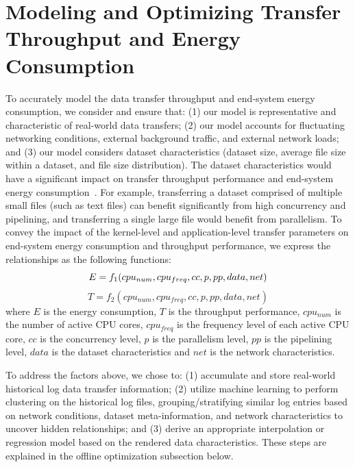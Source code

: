 \documentclass[conference]{IEEEtran}
\begin{document}
\section{Modeling and Optimizing Transfer Throughput and Energy Consumption}
To accurately model the data transfer throughput and end-system energy consumption, we consider and ensure that:
(1) our model is representative and characteristic of real-world data transfers; (2) our model accounts for fluctuating networking conditions, external background traffic, and external network loads; and (3) our model considers dataset characteristics (dataset size, average file size within a dataset, and file size distribution). The dataset characteristics would have a significant impact on transfer throughput performance and end-system energy consumption~\cite{alan2015energy}. For example, transferring a dataset comprised of multiple small files (such as text files) can benefit significantly from high concurrency and pipelining, and transferring a single large file would benefit from parallelism. To convey the impact of the kernel-level and application-level transfer parameters on end-system energy consumption and throughput performance, we express the relationships as the following functions:  
\begin{equation}
\label{Energy_Equation_2}
E = f_1(cpu_{num}, cpu_{freq}, cc, p, pp, data, net)\newline 
\end{equation}
\begin{equation}
\label{Throughput_Equation}
T = f_2(cpu_{num}, cpu_{freq}, cc, p, pp, data, net) 
\end{equation}
where $E$ is the energy consumption, $T$ is the throughput performance, $cpu_{num}$ is the number of active CPU cores, $cpu_{freq}$ is the frequency level of each active CPU core, $cc$ is the concurrency level, $p$ is the parallelism level, $pp$ is the pipelining level, $data$ is the dataset characteristics and $net$ is the network characteristics.

To address the factors above, we chose to: 
(1) accumulate and store real-world historical log data transfer information; %
(2) utilize machine learning to perform clustering on the historical log files, grouping/stratifying similar log entries based on network conditions, dataset meta-information, and network characteristics to uncover hidden relationships; and (3) derive an appropriate interpolation or regression model based on the rendered data characteristics. These steps are explained in the offline optimization subsection below.
\end{document}
